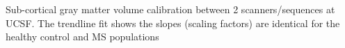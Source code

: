 \label{fig:hcms_scGMV} Sub-cortical gray matter volume calibration between 2 scanners/sequences at UCSF. The trendline fit shows the slopes (scaling factors) are identical for the healthy control and MS populations